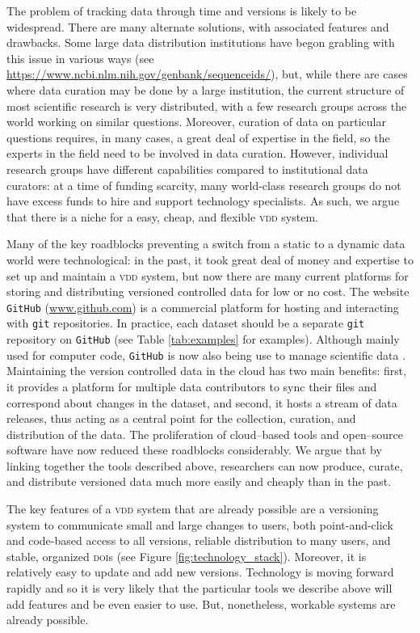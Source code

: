 \documentclass[a4paper,11pt]{article}
\newcommand{\smurl}[1]{{\footnotesize\url{#1}}}
\begin{document}
The problem of tracking data through time and versions is likely to be widespread. There are many alternate solutions, with associated features and drawbacks.  Some large data distribution institutions have begon grabling with this issue in various ways (see \url{https://www.ncbi.nlm.nih.gov/genbank/sequenceids/}), but, while there are cases where data curation may be done by a large institution, the current structure of most scientific research is very distributed, with a few research groups across the world working on similar questions.  Moreover, curation of data on particular questions requires, in many cases, a great deal of expertise in the field, so the experts in the field need to be involved in data curation. However, individual research groups have different capabilities compared to institutional data curators: at a time of funding scarcity, many world-class research groups do not have excess funds to hire and support technology specialists.  As such, we argue that there is a niche for a easy, cheap, and flexible \textsc{vdd} system.

Many of the key roadblocks preventing a switch from a static to a dynamic data world were technological: in the past, it took great deal of money and expertise to set up and maintain a \textsc{vdd} system, but now there are many current platforms for storing and distributing versioned controlled data for low or no cost.  The website \texttt{GitHub} (\smurl{www.github.com}) is a commercial platform for hosting and interacting with \texttt{git} repositories. In practice, each dataset should be a separate \texttt{git} repository on \texttt{GitHub} (see Table \ref{tab:examples} for examples). Although mainly used for computer code, \texttt{GitHub} is now also being use to manage scientific data \citep{Perkel-2016}. Maintaining the version controlled data in the cloud has two main benefits: first, it provides a platform for multiple data contributors to sync their files and correspond about changes in the dataset, and second, it hosts a stream of data releases, thus acting as a central point for  the collection, curation, and distribution of the data.  The proliferation of cloud--based tools and open--source software have now reduced these roadblocks considerably.  We argue that by linking together the tools described above, researchers can now produce, curate, and distribute versioned data much more easily and cheaply than in the past.

The key features of a \textsc{vdd} system that are already possible are a versioning system to communicate small and large changes to users, both point-and-click and code-based access to all versions, reliable distribution to many users, and stable, organized \textsc{doi}s (see Figure \ref{fig:technology_stack}).  Moreover, it is relatively easy to update and add new versions.  Technology is moving forward rapidly and so it is very likely that the particular tools we describe above will add features and be even easier to use.  But, nonetheless, workable systems are already possible.
\end{document}
